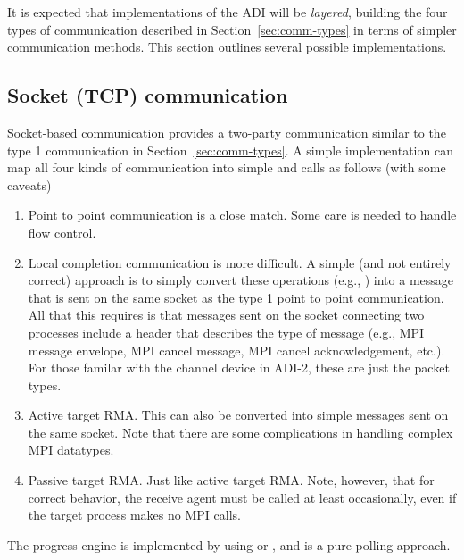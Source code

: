 It is expected that implementations of the ADI will be \emph{layered},
building the four types of communication described in
Section~\ref{sec:comm-types} in terms of simpler communication methods.
This section outlines several possible implementations.

\subsection{Socket (TCP) communication}
Socket-based communication provides a two-party communication similar
to the type 1 communication in Section~\ref{sec:comm-types}.  A simple
implementation can map all four kinds of communication into simple
 and  calls as follows (with some caveats)
\begin{enumerate}
\item Point to point communication is a close match.  Some care is
needed to handle flow control.

\item Local completion communication is more difficult.  A simple (and
not entirely correct) approach is to simply convert these operations
(e.g., ) into a message that is sent on the
same socket as the type 1 point to point communication.  All that this
requires is that messages sent on the socket connecting two processes
include a header that describes the type of message (e.g., MPI message
envelope, MPI cancel message, MPI cancel acknowledgement, etc.).  For
those familar with the channel device in ADI-2, these are just the
packet types.

\item Active target RMA.  This can also be converted into simple
messages sent on the same socket.  Note that there are some
complications in handling complex MPI datatypes.

\item Passive target RMA.  Just like active target RMA.  Note,
however, that for correct behavior, the receive agent must be called
at least occasionally, even if the target process makes no MPI calls.
\end{enumerate}

The progress engine is implemented by using  or , and
is a pure polling approach. 

